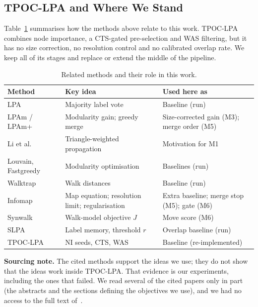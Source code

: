\documentclass[conference]{IEEEtran}
\begin{document}
\subsection{TPOC-LPA and Where We Stand}
Table~\ref{tab:related} summarises how the methods above relate to this work. TPOC-LPA~\cite{kong2026} combines node importance, a CTS-gated pre-selection and WAS filtering, but it has no size correction, no resolution control and no calibrated overlap rate. We keep all of its stages and replace or extend the middle of the pipeline.
\begin{table}[H]
\centering
\caption{Related methods and their role in this work.}
\label{tab:related}
\scriptsize
\begin{tabular}{>{\raggedright\arraybackslash}p{19mm}>{\raggedright\arraybackslash}p{26mm}>{\raggedright\arraybackslash}p{29mm}}
\toprule
Method & Key idea & Used here as \\
\midrule
LPA~\cite{raghavan2007} & Majority label vote & Baseline (run) \\
LPAm / LPAm+~\cite{barber2009,liu2010} & Modularity gain; greedy merge & Size-corrected gain (M3); merge order (M5) \\
Li et al.~\cite{li2020motif} & Triangle-weighted propagation & Motivation for M1 \\
Louvain, Fastgreedy~\cite{blondel2008,clauset2004} & Modularity optimisation & Baselines (run) \\
Walktrap~\cite{pons2006} & Walk distances & Baseline (run) \\
Infomap~\cite{rosvall2008,kawamoto2015,smiljanic2020} & Map equation; resolution limit; regularisation & Extra baseline; merge stop (M5); gate (M6) \\
Synwalk~\cite{toth2022} & Walk-model objective $J$ & Move score (M6) \\
SLPA~\cite{xie2011} & Label memory, threshold $r$ & Overlap baseline (run) \\
TPOC-LPA~\cite{kong2026} & NI seeds, CTS, WAS & Baseline (re-implemented) \\
\bottomrule
\end{tabular}
\end{table}
\textbf{Sourcing note.} The cited methods support the ideas we use; they do not show that the ideas work inside TPOC-LPA. That evidence is our experiments, including the ones that failed. We read several of the cited papers only in part (the abstracts and the sections defining the objectives we use), and we had no access to the full text of~\cite{li2020motif}.
\end{document}
